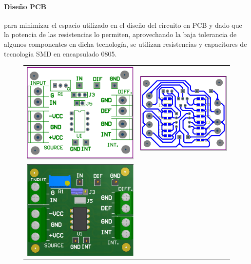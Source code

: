\paragraph*{Dise\~no PCB} para minimizar el espacio utilizado en el diseño del circuito en PCB y dado que la potencia de las resistencias lo permiten, aprovechando la baja tolerancia de algunos
componentes en dicha tecnolog\'ia, se utilizan resistencias y capacitores de tecnolog\'ia SMD en encapsulado 0805.

\begin{figure}[H]
	\centering
	\begin{tabular}{c c}
		\includegraphics[scale=0.6]{Recursos/Altium/Placa_OVERLAY.png} &
		\includegraphics[scale=0.6]{Recursos/Altium/Placa_PCB.png} \\
		\includegraphics[scale=0.6]{Recursos/Altium/Placa_3D_OVERLAY.png} &

\end{tabular}
\end{figure}
